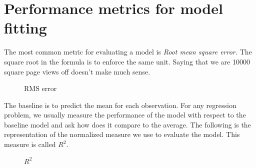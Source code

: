 \section {Performance metrics for model fitting}
The most common metric for evaluating a model is \emph{Root mean square error.} The square root in the formula is to enforce the same unit. Saying that we are 10000 square page views off doesn't make much sense.
\begin{figure}[h]
\centering
\caption{RMS error}
{\setlength{\fboxsep}{20pt}
\setlength{\fboxrule}{1pt}
\textcolor{DarkBlue}{}
}
\end{figure} 

\newpage
The baseline is to predict the mean for each observation. For any regression problem, we usually measure the performance of the model with respect to the baseline model and ask how does it compare to the average.
The following is the representation of the normalized measure we use to evaluate the model. This measure is called $R^2$.

\begin{figure}[h]
\centering
\caption{$R^2$}
{\setlength{\fboxsep}{20pt}
\setlength{\fboxrule}{1pt}
\textcolor{cyan}{}
}
\end{figure} 

